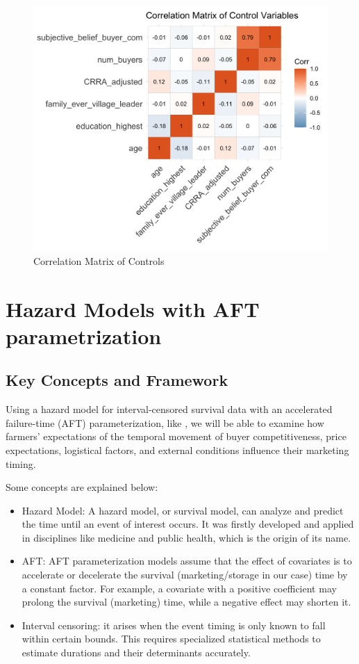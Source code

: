 \documentclass[12pt]{article}
\begin{document}
\newpage
\begin{figure}[H]
\centering
\includegraphics[width=1\textwidth]{Figures/correlation_matrix_controls.png}
\caption{Correlation Matrix of Controls}
\label{Figure: Correlation Matrix of Controls}
\end{figure}






\newpage
\section{Hazard Models with AFT parametrization}
\subsection{Key Concepts and Framework}
Using a hazard model for interval-censored survival data with an accelerated failure-time (AFT) parameterization, like \cite{albuquerque2024market}, we will be able to examine how farmers' expectations of the temporal movement of buyer competitiveness, price expectations, logistical factors, and external conditions influence their marketing timing.

Some concepts are explained below:
\begin{itemize}
    \item Hazard Model: A hazard model, or survival model, can analyze and predict the time until an event of interest occurs. It was firstly developed and applied in disciplines like medicine and public health, which is the origin of its name. 
    \item AFT: AFT parameterization models assume that the effect of covariates is to accelerate or decelerate the survival (marketing/storage in our case) time by a constant factor. For example, a covariate with a positive coefficient may prolong the survival (marketing) time, while a negative effect may shorten it.
    \item Interval censoring: it arises when the event timing is only known to fall within certain bounds. This requires specialized statistical methods to estimate durations and their determinants accurately. 
\end{itemize}
\end{document}

